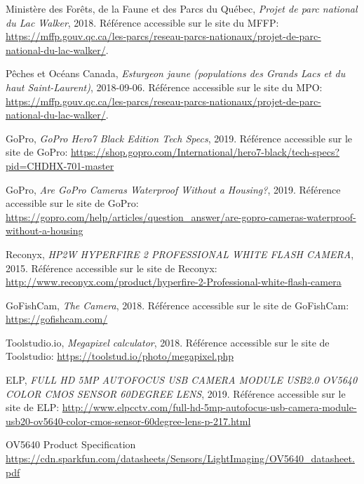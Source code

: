 
%
%

\begin{thebibliographyUL}{9} %

 Ministère des Forêts, de la Faune et des Parcs du Québec, \emph{Projet de parc national du Lac Walker}, 2018. Référence accessible sur le site du MFFP: \url{https://mffp.gouv.qc.ca/les-parcs/reseau-parcs-nationaux/projet-de-parc-national-du-lac-walker/}.

 Pêches et Océans Canada, \emph{Esturgeon jaune (populations des Grands Lacs et du haut Saint-Laurent)}, 2018-09-06. Référence accessible sur le site du MPO: \url{https://mffp.gouv.qc.ca/les-parcs/reseau-parcs-nationaux/projet-de-parc-national-du-lac-walker/}.

 GoPro, \emph{GoPro Hero7 Black Edition Tech Specs}, 2019. Référence accessible sur le site de GoPro: \url{https://shop.gopro.com/International/hero7-black/tech-specs?pid=CHDHX-701-master}

 GoPro, \emph{Are GoPro Cameras Waterproof Without a Housing?}, 2019. Référence accessible sur le site de GoPro: \url{https://gopro.com/help/articles/question_answer/are-gopro-cameras-waterproof-without-a-housing}

 Reconyx, \emph{HP2W HYPERFIRE 2 PROFESSIONAL WHITE FLASH CAMERA}, 2015. Référence accessible sur le site de Reconyx: \url{http://www.reconyx.com/product/hyperfire-2-Professional-white-flash-camera}

 GoFishCam, \emph{The Camera}, 2018. Référence accessible sur le site de GoFishCam: \url{https://gofishcam.com/}

 Toolstudio.io, \emph{Megapixel calculator}, 2018. Référence accessible sur le site de Toolstudio: \url{https://toolstud.io/photo/megapixel.php}

 ELP, \emph{FULL HD 5MP AUTOFOCUS USB CAMERA MODULE USB2.0 OV5640 COLOR CMOS SENSOR 60DEGREE LENS}, 2019. Référence accessible sur le site de ELP: \url{http://www.elpcctv.com/full-hd-5mp-autofocus-usb-camera-module-usb20-ov5640-color-cmos-sensor-60degree-lens-p-217.html}

 OV5640 Product Specification \url{https://cdn.sparkfun.com/datasheets/Sensors/LightImaging/OV5640_datasheet.pdf}


\end{thebibliographyUL}
